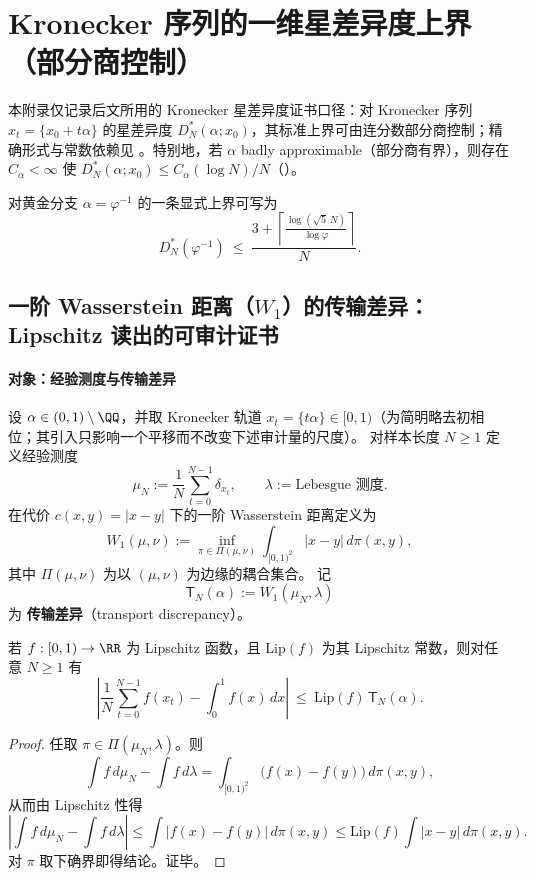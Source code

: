 \section{Kronecker 序列的一维星差异度上界（部分商控制）}\label{app:kronecker-discrepancy}

本附录仅记录后文所用的 Kronecker 星差异度证书口径：对 Kronecker 序列
\(x_t=\{x_0+t\alpha\}\) 的星差异度 \(D_N^\ast(\alpha;x_0)\)，其标准上界可由连分数部分商控制；精确形式与常数依赖见 \cite{KuipersNiederreiter1974,Goda2024QuasiUniformKronecker}。特别地，若 \(\alpha\) badly approximable（部分商有界），则存在 \(C_\alpha<\infty\) 使 \(D_N^\ast(\alpha;x_0)\le C_\alpha(\log N)/N\)（\cite{KuipersNiederreiter1974}）。
\par
对黄金分支 \(\alpha=\varphi^{-1}\) 的一条显式上界可写为
\[
D_N^*(\varphi^{-1})\ \le\ \frac{3+\left\lceil \frac{\log(\sqrt5\,N)}{\log \varphi}\right\rceil}{N}.
\]

\subsection{一阶 Wasserstein 距离（\texorpdfstring{$W_1$}{W1}）的传输差异：Lipschitz 读出的可审计证书}\label{app:kronecker-w1-transport}

\paragraph{对象：经验测度与传输差异}
设 \(\alpha\in(0,1)\setminus\QQ\)，并取 Kronecker 轨道 \(x_t=\{t\alpha\}\in[0,1)\)（为简明略去初相位；其引入只影响一个平移而不改变下述审计量的尺度）。
对样本长度 \(N\ge 1\) 定义经验测度
\[
\mu_N:=\frac1N\sum_{t=0}^{N-1}\delta_{x_t},
\qquad
\lambda:=\text{Lebesgue 测度}.
\]
在代价 \(c(x,y)=|x-y|\) 下的一阶 Wasserstein 距离定义为
\[
W_1(\mu,\nu):=\inf_{\pi\in\Pi(\mu,\nu)}\int_{[0,1)^2}|x-y|\,d\pi(x,y),
\]
其中 \(\Pi(\mu,\nu)\) 为以 \((\mu,\nu)\) 为边缘的耦合集合。
记
\[
\mathsf{T}_N(\alpha):=W_1(\mu_N,\lambda)
\]
为 \textbf{传输差异}（transport discrepancy）。

\begin{theorem}\label{thm:kronecker-w1-lipschitz-readout}
若 \(f:[0,1)\to\RR\) 为 Lipschitz 函数，且 \(\mathrm{Lip}(f)\) 为其 Lipschitz 常数，则对任意 \(N\ge 1\) 有
\[
\left|\frac1N\sum_{t=0}^{N-1}f(x_t)-\int_0^1 f(x)\,dx\right|
\ \le\
\mathrm{Lip}(f)\,\mathsf{T}_N(\alpha).
\]
\end{theorem}
\begin{proof}
任取 \(\pi\in\Pi(\mu_N,\lambda)\)。则
\[
\int f\,d\mu_N-\int f\,d\lambda=\int_{[0,1)^2}\bigl(f(x)-f(y)\bigr)\,d\pi(x,y),
\]
从而由 Lipschitz 性得
\[
\left|\int f\,d\mu_N-\int f\,d\lambda\right|
\le
\int |f(x)-f(y)|\,d\pi(x,y)
\le
\mathrm{Lip}(f)\int |x-y|\,d\pi(x,y).
\]
对 \(\pi\) 取下确界即得结论。证毕。
\end{proof}

